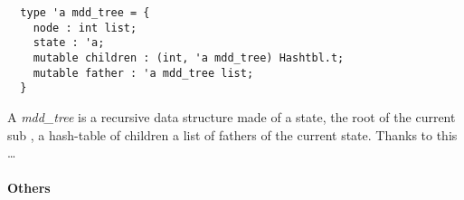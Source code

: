 \begin{verbatim}
  type 'a mdd_tree = {
    node : int list;
    state : 'a;
    mutable children : (int, 'a mdd_tree) Hashtbl.t;
    mutable father : 'a mdd_tree list;
  }
\end{verbatim}

A \textit{mdd\_tree} is a recursive data structure made of a state, the root of the current sub \mdd, a hash-table of children a list of fathers of the current state. Thanks to this \dots{}

\paragraph{Others}